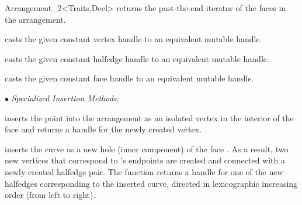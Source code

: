 \begin{ccRefClass}{Arrangement_2<Traits,Dcel>}
    {returns the past-the-end iterator of the faces in the arrangement.}
    

\begin{ccAdvanced}

 
    {casts the given constant vertex handle to an equivalent mutable handle.}

    {casts the given constant halfedge handle to an equivalent mutable handle.}

    {casts the given constant face handle to an equivalent mutable handle.}

\end{ccAdvanced}

\ccModifiers

$\bullet$ {\sl Specialized Insertion Methods:}

   {inserts the point  into the arrangement as an isolated vertex in
    the interior of the face  and returns a handle for the newly
    created vertex.
    }

   {inserts the curve  as a new hole (inner component) of the face
    . As a result, two new vertices that correspond to 's
    endpoints are created and connected with a newly created halfedge pair.
    The function returns a handle for one of the new halfedges
    corresponding to the inserted curve, directed in lexicographic
    increasing order (from left to right).
    }


\end{ccRefClass}
